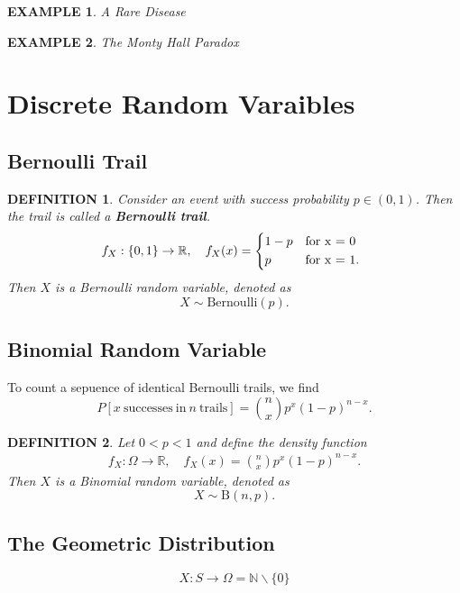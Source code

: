 \documentclass[11pt,a4paper]{article}
\newtheorem*{example}{\bf EXAMPLE}
\newtheorem*{definition}{\bf DEFINITION}
\begin{document}
\begin{example}
    A Rare Disease
\end{example}
\begin{example}
    The Monty Hall Paradox
\end{example}


\section{Discrete Random Varaibles}
\subsection{Bernoulli Trail}
\begin{definition}
    Consider an event with success probability $p\in(0,1)$. Then the trail is called
    a {\bf Bernoulli trail}.
    \begin{align}
        f_X:\{0,1\}\rightarrow \mathbb{R}, \quad f_X(x)=\begin{cases*}
                                                            1-p & {\rm for} x = 0  \\
                                                            p   & {\rm for} x = 1.
                                                        \end{cases*}
    \end{align}
    Then $X$ is a Bernoulli random variable, denoted as\[X\sim \mathrm{Bernoulli}(p).\]
\end{definition}

\subsection{Binomial Random Variable}
To count a sepuence of identical Bernoulli trails, we find\[P[x \mathrm{\ successes\ in\ } n \mathrm{\ trails}]=
    \binom{n}{x}p^x(1-p)^{n-x}.\]
\begin{definition}
    Let $0<p<1$ and define the density function
    \begin{align}
        f_X:\varOmega \rightarrow \mathbb{R},
        \quad f_X(x)=\binom{n}{x}p^x(1-p)^{n-x}.
    \end{align}
    Then $X$ is a Binomial random variable, denoted as\[X\sim \mathrm{B}(n,p).\]
\end{definition}

\subsection{The Geometric Distribution}
\[X: S\rightarrow\Omega = \mathbb{N} \backslash \{0\}\]
\end{document}
